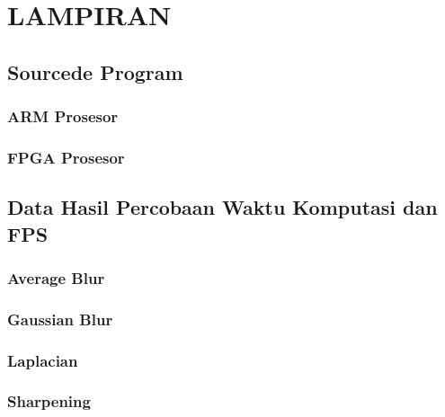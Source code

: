\chapter*{LAMPIRAN}
\setcounter{chapter}{7}

\section{Sourcede Program}

\subsection{ARM Prosesor}
\label{code:filter-spasial-ARM}

    
\subsection{FPGA Prosesor}
\label{code:filter-spasial-FPGA}



\section{Data Hasil Percobaan Waktu Komputasi dan FPS}
\label{lampiran:waktu-komputasi}

\subsection{Average Blur}

\subsection{Gaussian Blur}

\subsection{Laplacian}

\subsection{Sharpening}

